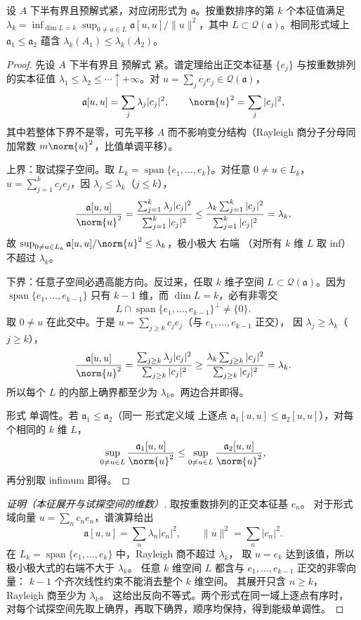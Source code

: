 \begin{theorem}[极小极大与形式单调性]
设 $A$ 下半有界且预解式紧，对应闭形式为 $\mathfrak a$。按重数排序的第 $k$ 个本征值满足 $\lambda_k=\inf_{\dim L=k}\sup_{0\ne u\in L}\mathfrak a[u,u]/\|u\|^2$，其中 $L\subset\mathcal Q(\mathfrak a)$。相同形式域上 $\mathfrak a_1\le\mathfrak a_2$ 蕴含 $\lambda_k(A_1)\le\lambda_k(A_2)$。
\end{theorem}
\begin{proof}
先设 $A$ 下半有界且 预解式 紧。谱定理给出正交本征基 $\{e_j\}$ 与按重数排列的实本征值
$\lambda_1\le\lambda_2\le\cdots\uparrow+\infty$。对
$u=\sum_j c_je_j\in\mathcal Q(\mathfrak a)$，
\[
 \mathfrak a[u,u]=\sum_j\lambda_j|c_j|^2,
 \qquad
 \norm{u}^2=\sum_j|c_j|^2,
\]
其中若整体下界不是零，可先平移 $A$ 而不影响变分结构（Rayleigh 商分子分母同加常数
$m\norm{u}^2$，比值单调平移）。

上界：取试探子空间。取 $L_k=\operatorname{span}\{e_1,\ldots,e_k\}$。对任意
$0\ne u\in L_k$，$u=\sum_{j=1}^kc_je_j$，因 $\lambda_j\le\lambda_k$（$j\le k$），
\[
 \frac{\mathfrak a[u,u]}{\norm{u}^2}
 =\frac{\sum_{j=1}^k\lambda_j|c_j|^2}{\sum_{j=1}^k|c_j|^2}
 \le\frac{\lambda_k\sum_{j=1}^k|c_j|^2}{\sum_{j=1}^k|c_j|^2}
 =\lambda_k,
\]
故 $\sup_{0\ne u\in L_k}\mathfrak a[u,u]/\norm{u}^2\le\lambda_k$，极小极大 右端
（对所有 $k$ 维 $L$ 取 inf）不超过 $\lambda_k$。

下界：任意子空间必遇高能方向。反过来，任取 $k$ 维子空间
$L\subset\mathcal Q(\mathfrak a)$。因为
$\operatorname{span}\{e_1,\ldots,e_{k-1}\}$ 只有 $k-1$ 维，而
$\dim L=k$，必有非零交
\[
 L\cap\operatorname{span}\{e_1,\ldots,e_{k-1}\}^\perp\neq\{0\}.
\]
取 $0\ne u$ 在此交中。于是 $u=\sum_{j\ge k}c_je_j$（与 $e_1,\ldots,e_{k-1}$ 正交），
因 $\lambda_j\ge\lambda_k$（$j\ge k$），
\[
 \frac{\mathfrak a[u,u]}{\norm{u}^2}
 =\frac{\sum_{j\ge k}\lambda_j|c_j|^2}{\sum_{j\ge k}|c_j|^2}
 \ge\frac{\lambda_k\sum_{j\ge k}|c_j|^2}{\sum_{j\ge k}|c_j|^2}
 =\lambda_k.
\]
所以每个 $L$ 的内部上确界都至少为 $\lambda_k$。两边合并即得。

形式 单调性。若 $\mathfrak a_1\le\mathfrak a_2$（同一 形式定义域 上逐点
$\mathfrak a_1[u,u]\le\mathfrak a_2[u,u]$），对每个相同的 $k$ 维 $L$，
\[
 \sup_{0\ne u\in L}\frac{\mathfrak a_1[u,u]}{\norm{u}^2}
 \le\sup_{0\ne u\in L}\frac{\mathfrak a_2[u,u]}{\norm{u}^2},
\]
再分别取 infimum 即得。
\end{proof}


\begin{proof}[证明（本征展开与试探空间的维数）]
取按重数排列的正交本征基 $e_n$。
对于形式域向量 $u=\sum_n c_ne_n$，谱演算给出
\[
\mathfrak a[u,u]=\sum_n\lambda_n|c_n|^2,
\qquad \|u\|^2=\sum_n|c_n|^2.
\]
在 $L_k=\operatorname{span}\{e_1,\dots,e_k\}$ 中，Rayleigh 商不超过 $\lambda_k$，
取 $u=e_k$ 达到该值，所以极小极大式的右端不大于 $\lambda_k$。
任意 $k$ 维空间 $L$ 都含与 $e_1,\dots,e_{k-1}$ 正交的非零向量：
$k-1$ 个齐次线性约束不能消去整个 $k$ 维空间。
其展开只含 $n\ge k$，Rayleigh 商至少为 $\lambda_k$。
这给出反向不等式。两个形式在同一域上逐点有序时，
对每个试探空间先取上确界，再取下确界，顺序均保持，得到能级单调性。
\end{proof}

